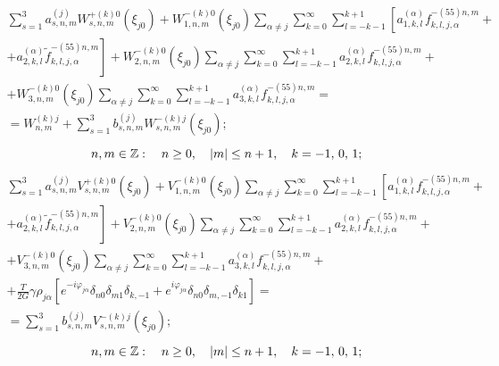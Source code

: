 \begin{russian}
\begin{multline}
\sum\limits_{s = 1}^3 {a_{s,n,m}^{(j)}} W_{s,n,m}^{ + (k)0}({\xi _{j0}}) + W_{1,n,m}^{ - (k)0}({\xi _{j0}})\sum\limits_{\alpha  \ne j} {\sum\limits_{k = 0}^\infty  {\sum\limits_{l =  - k - 1}^{k + 1} {\left[ {a_{1,k,l}^{(\alpha )}f_{k,l,j,\alpha }^{ - (55)n,m} + } \right.} } } \\
\left. { + a_{2,k,l}^{(\alpha )}\tilde f_{k,l,j,\alpha }^{ - (55)n,m}} \right] + W_{2,n,m}^{ - (k)0}({\xi _{j0}})\sum\limits_{\alpha  \ne j} {\sum\limits_{k = 0}^\infty  {\sum\limits_{l =  - k - 1}^{k + 1} {a_{2,k,l}^{(\alpha )}} } f_{k,l,j,\alpha }^{ - (55)n,m} + } \\
+ W_{3,n,m}^{ - (k)0}({\xi _{j0}})\sum\limits_{\alpha  \ne j} {\sum\limits_{k = 0}^\infty  {\sum\limits_{l =  - k - 1}^{k + 1} {a_{3,k,l}^{(\alpha )}} } f_{k,l,j,\alpha }^{ - (55)n,m}}  = \\
= W_{n,m}^{(k)j} + \sum\limits_{s = 1}^3 {b_{s,n,m}^{(j)}} W_{s,n,m}^{ - (k)j}({\xi _{j0}});
\end{multline}
$$
n,m \in\mathbb{Z}:\quad n \ge 0,\quad |m| \le n + 1,\quad k =  - 1,{\mkern 1mu} {\kern 1pt} 0,{\mkern 1mu} {\kern 1pt} 1;
$$
\begin{multline}
\sum\limits_{s = 1}^3 {a_{s,n,m}^{(j)}} V_{s,n,m}^{ + (k)0}({\xi _{j0}}) + V_{1,n,m}^{ - (k)0}({\xi _{j0}})\sum\limits_{\alpha  \ne j} {\sum\limits_{k = 0}^\infty  {\sum\limits_{l =  - k - 1}^{k + 1} {\left[ {a_{1,k,l}^{(\alpha )}f_{k,l,j,\alpha }^{ - (55)n,m} + } \right.} } } \\
\left. { + a_{2,k,l}^{(\alpha )}\tilde f_{k,l,j,\alpha }^{ - (55)n,m}} \right] + V_{2,n,m}^{ - (k)0}({\xi _{j0}})\sum\limits_{\alpha  \ne j} {\sum\limits_{k = 0}^\infty  {\sum\limits_{l =  - k - 1}^{k + 1} {a_{2,k,l}^{(\alpha )}} } f_{k,l,j,\alpha }^{ - (55)n,m} + } \\
+ V_{3,n,m}^{ - (k)0}({\xi _{j0}})\sum\limits_{\alpha  \ne j} {\sum\limits_{k = 0}^\infty  {\sum\limits_{l =  - k - 1}^{k + 1} {a_{3,k,l}^{(\alpha )}} } f_{k,l,j,\alpha }^{ - (55)n,m} + } \\
+ \frac{T}{{2G}}\gamma {\rho _{j\alpha }}\left[ {{e^{ - i{\varphi _{j\alpha }}}}{\delta _{n0}}{\delta _{m1}}{\delta _{k, - 1}} + {e^{i{\varphi _{j\alpha }}}}{\delta _{n0}}{\delta _{m, - 1}}{\delta _{k1}}} \right] = \\
= \sum\limits_{s = 1}^3 {b_{s,n,m}^{(j)}} V_{s,n,m}^{ - (k)j}({\xi _{j0}});
\end{multline}
$$
n,m \in\mathbb{Z}:\quad n \ge 0,\quad |m| \le n + 1,\quad k =  - 1,{\mkern 1mu} {\kern 1pt} 0,{\mkern 1mu} {\kern 1pt} 1;
$$
\end{russian}
